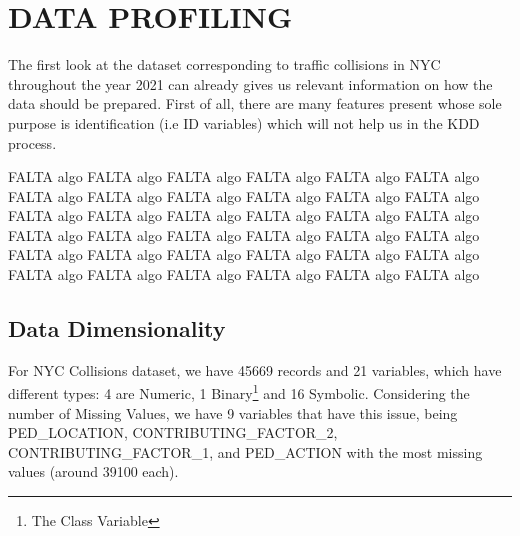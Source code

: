 \documentclass[11pt]{article}
\begin{document}
\section{DATA PROFILING}
 The first look at the dataset corresponding to traffic collisions in NYC throughout the year 2021 can already gives us relevant information on how the data should be prepared. First of all, there are many features present whose sole purpose is identification (i.e ID variables) which will not help us in the KDD process.

 FALTA algo FALTA algo FALTA algo FALTA algo FALTA algo FALTA algo FALTA algo FALTA algo FALTA algo FALTA algo FALTA algo FALTA algo FALTA algo FALTA algo FALTA algo FALTA algo FALTA algo FALTA algo FALTA algo FALTA algo FALTA algo FALTA algo FALTA algo FALTA algo FALTA algo FALTA algo FALTA algo FALTA algo FALTA algo FALTA algo FALTA algo FALTA algo FALTA algo FALTA algo FALTA algo FALTA algo 

\subsection*{Data Dimensionality}


 For NYC Collisions dataset, we have 45669 records and 21 variables, which have different types: 4 are Numeric, 1 Binary\footnote[1]{The Class Variable} and 16 Symbolic. Considering the number of Missing Values, we have 9 variables that have this issue, being PED\_LOCATION, CONTRIBUTING\_FACTOR\_2, CONTRIBUTING\_FACTOR\_1, and PED\_ACTION with the most missing values (around 39100 each).
\end{document}

